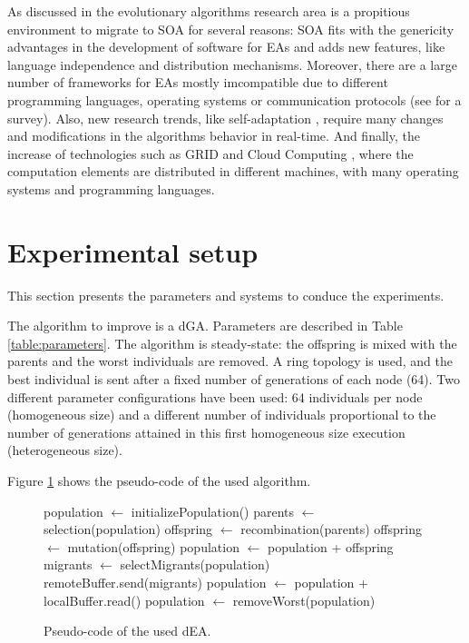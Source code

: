 As discussed in \cite{SOASOCO} the evolutionary algorithms research area is a propitious environment to migrate to SOA for several reasons: SOA fits with the genericity advantages in the development of software for EAs \citep{GENERICITY05} and adds new features, like language independence and  distribution mechanisms. Moreover, there are a large number of frameworks for EAs mostly imcompatible due to different programming languages, operating systems or communication protocols (see \cite{SURVEYMOFS} for a survey). Also, new research trends, like self-adaptation \citep{SELFSTAR}, require many changes and modifications in the algorithms behavior in real-time. And finally, the increase of technologies such as GRID and Cloud Computing \citep{CLOUD}, where the computation elements are distributed in different machines, with many operating systems and programming languages.




\section{Experimental setup}
\label{subsec:experiments}
This section presents the parameters and systems to conduce the experiments.

The algorithm to improve is a dGA. Parameters are described in Table \ref{table:parameters}. The algorithm is steady-state: the offspring is mixed with the parents and the worst individuals are removed. A ring topology is used, and the best individual is sent after a fixed number of generations of each node (64).  Two different parameter configurations have been used: 64 individuals per node (homogeneous size) and a different number of individuals proportional to the number of generations attained in this first homogeneous size execution (heterogeneous size).

Figure \ref{fig:EA} shows the pseudo-code of the used algorithm.

\begin{figure}

\begin{algorithmic}
\STATE population $\gets$ initializePopulation()
    \STATE parents $\gets$ selection(population)
    \STATE offspring $\gets$ recombination(parents)
    \STATE offspring $\gets$ mutation(offspring)
    \STATE population $\gets$ population + offspring
      \STATE migrants $\gets$ selectMigrants(population)
      \STATE remoteBuffer.send(migrants)
    \ENDIF
      \STATE population $\gets$ population + localBuffer.read()
    \ENDIF
    \STATE population $\gets$ removeWorst(population)
\ENDWHILE

\end{algorithmic}
\caption{Pseudo-code of the used dEA.}
\label{fig:EA}
\end{figure}


